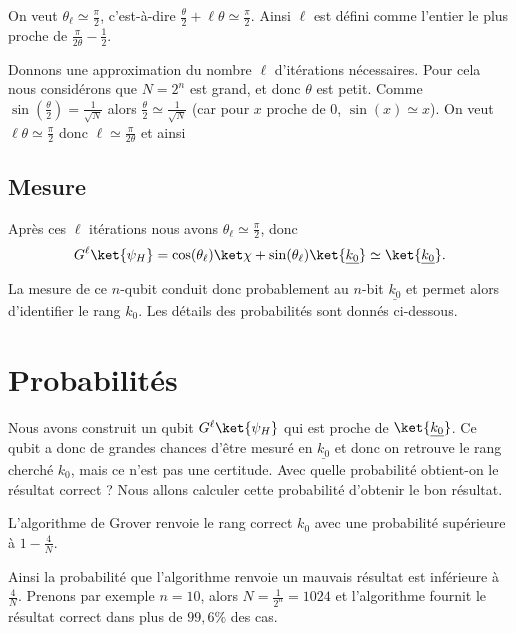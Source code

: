 \documentclass[11pt,class=report,crop=false]{standalone}
\begin{document}
On veut $\theta_\ell \simeq \frac\pi2$, c'est-à-dire $\frac\theta2+\ell\theta \simeq \frac\pi2$. Ainsi $\ell$ est défini comme l'entier le plus proche de $\frac{\pi}{2\theta}-\frac12$.


Donnons une approximation du nombre $\ell$ d'itérations nécessaires. Pour cela nous considérons que $N=2^n$ est grand, et donc $\theta$ est petit.
Comme $\sin\left(\frac\theta2\right)=\frac{1}{\sqrt{N}}$ alors
$\frac\theta2 \simeq \frac{1}{\sqrt{N}}$ (car pour $x$ proche de $0$, $\sin(x)\simeq x$). On veut $\ell\theta \simeq\frac\pi2$ donc
$\ell\simeq\frac\pi{2\theta}$ et ainsi


\subsection{Mesure}

Après ces $\ell$ itérations nous avons $\theta_\ell \simeq \frac\pi2$, donc
$$G^\ell\ket{\psi_H} = \cos(\theta_\ell) \ket\chi + \sin(\theta_\ell) \ket{\underline{k_0}} \simeq \ket{\underline{k_0}}.$$

La mesure de ce $n$-qubit conduit donc probablement au $n$-bit $\underline{k_0}$
et permet alors d'identifier le rang $k_0$. Les détails des probabilités sont donnés ci-dessous.


\section{Probabilités}


Nous avons construit un qubit $G^\ell\ket{\psi_H}$ qui est proche de $\ket{\underline{k_0}}$. Ce qubit a donc de grandes chances d'être mesuré 
en $\underline{k_0}$ et donc on retrouve le rang cherché $k_0$, mais ce n'est pas une certitude. Avec quelle probabilité obtient-on le résultat correct ?
Nous allons calculer cette probabilité d'obtenir le bon résultat.

\begin{proposition}
L'algorithme de Grover renvoie le rang correct $k_0$ avec une probabilité supérieure 
à $1-\frac4N$.
\end{proposition}

Ainsi la probabilité que l'algorithme renvoie un mauvais résultat est inférieure à $\frac4N$.
Prenons par exemple $n=10$, alors $N=\frac{1}{2^n}=1024$ et l'algorithme fournit le résultat correct dans plus de $99,6\%$ des cas.
\end{document}
